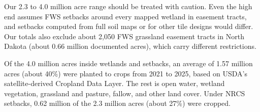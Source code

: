 \documentclass{theme/arpc-memo}
\begin{document}
Our 2.3 to 4.0 million acre range should be treated with caution. Even the high end assumes FWS setbacks around every mapped wetland in easement tracts, and setbacks computed from full soil maps or for other tile designs would differ. Our totals also exclude about 2,050 FWS grassland easement tracts in North Dakota (about 0.66 million documented acres), which carry different restrictions.

Of the 4.0 million acres inside wetlands and setbacks, an average of 1.57 million acres (about 40\%) were planted to crops from 2021 to 2025, based on USDA's satellite-derived Cropland Data Layer. The rest is open water, wetland vegetation, grassland and pasture, fallow, and other land cover. Under NRCS setbacks, 0.62 million of the 2.3 million acres (about 27\%) were cropped.

\end{document}
